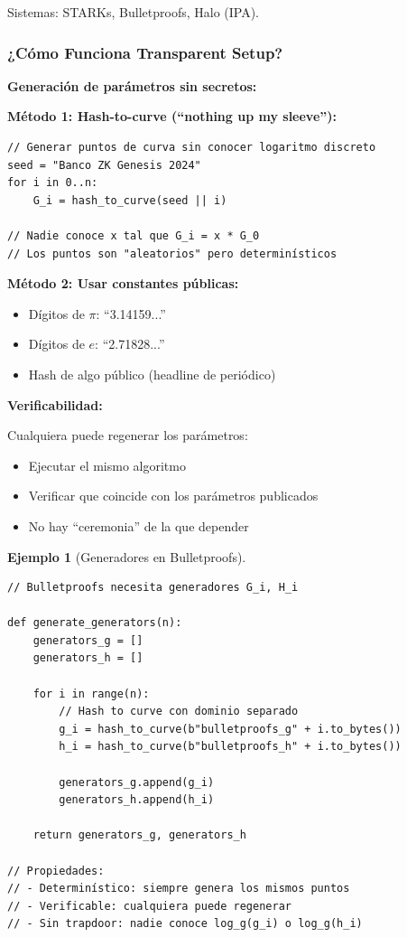 \documentclass[11pt,a4paper,twoside,openright]{book}
\theoremstyle{definition}
\newtheorem{example}{Ejemplo}[chapter]
\theoremstyle{plain}
\theoremstyle{remark}
\begin{document}
Sistemas: STARKs, Bulletproofs, Halo (IPA).

\subsubsection{¿Cómo Funciona Transparent Setup?}

\begin{keyidea}
\textbf{Generación de parámetros sin secretos:}

\textbf{Método 1: Hash-to-curve (``nothing up my sleeve''):}
\begin{verbatim}
// Generar puntos de curva sin conocer logaritmo discreto
seed = "Banco ZK Genesis 2024"
for i in 0..n:
    G_i = hash_to_curve(seed || i)
    
// Nadie conoce x tal que G_i = x * G_0
// Los puntos son "aleatorios" pero determinísticos
\end{verbatim}

\textbf{Método 2: Usar constantes públicas:}
\begin{itemize}
    \item Dígitos de $\pi$: ``3.14159...''
    \item Dígitos de $e$: ``2.71828...''
    \item Hash de algo público (headline de periódico)
\end{itemize}

\textbf{Verificabilidad:}

Cualquiera puede regenerar los parámetros:
\begin{itemize}
    \item Ejecutar el mismo algoritmo
    \item Verificar que coincide con los parámetros publicados
    \item No hay ``ceremonia'' de la que depender
\end{itemize}
\end{keyidea}

\begin{example}[Generadores en Bulletproofs]
\begin{verbatim}
// Bulletproofs necesita generadores G_i, H_i

def generate_generators(n):
    generators_g = []
    generators_h = []
    
    for i in range(n):
        // Hash to curve con dominio separado
        g_i = hash_to_curve(b"bulletproofs_g" + i.to_bytes())
        h_i = hash_to_curve(b"bulletproofs_h" + i.to_bytes())
        
        generators_g.append(g_i)
        generators_h.append(h_i)
    
    return generators_g, generators_h

// Propiedades:
// - Determinístico: siempre genera los mismos puntos
// - Verificable: cualquiera puede regenerar
// - Sin trapdoor: nadie conoce log_g(g_i) o log_g(h_i)
\end{verbatim}
\end{example}
\end{document}
